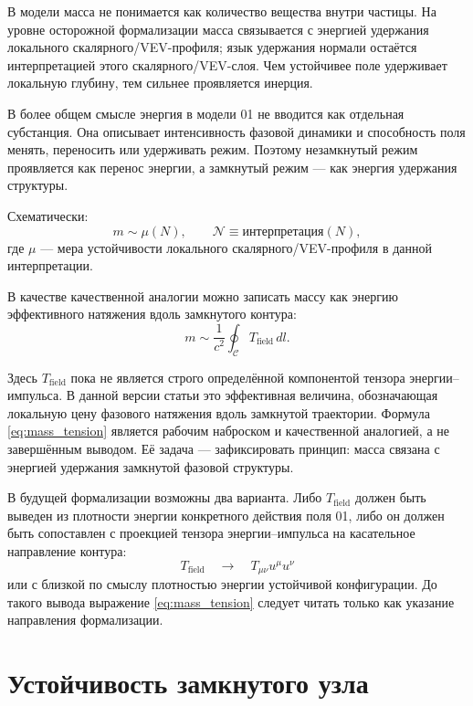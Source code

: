 \documentclass[11pt,a4paper]{article}
\newcommand{\normal}{\mathcal{N}}
\newcommand{\contour}{\mathcal{C}}
\begin{document}
В модели масса не понимается как количество вещества внутри частицы. На уровне осторожной формализации масса связывается с энергией удержания локального скалярного/VEV-профиля; язык удержания нормали остаётся интерпретацией этого скалярного/VEV-слоя. Чем устойчивее поле удерживает локальную глубину, тем сильнее проявляется инерция.

В более общем смысле энергия в модели 01 не вводится как отдельная субстанция. Она описывает интенсивность фазовой динамики и способность поля менять, переносить или удерживать режим. Поэтому незамкнутый режим проявляется как перенос энергии, а замкнутый режим --- как энергия удержания структуры.

Схематически:
\begin{equation}
 m \sim \mu(N), \qquad \normal \equiv \text{интерпретация}(N),
\end{equation}
где $\mu$ --- мера устойчивости локального скалярного/VEV-профиля в данной интерпретации.

В качестве качественной аналогии можно записать массу как энергию эффективного натяжения вдоль замкнутого контура:
\begin{equation}
 m \sim \frac{1}{c^2}\oint_{\contour} T_{\mathrm{field}}\, dl.
\label{eq:mass_tension}
\end{equation}

Здесь $T_{\mathrm{field}}$ пока не является строго определённой компонентой тензора энергии--импульса. В данной версии статьи это эффективная величина, обозначающая локальную цену фазового натяжения вдоль замкнутой траектории. Формула \eqref{eq:mass_tension} является рабочим наброском и качественной аналогией, а не завершённым выводом. Её задача --- зафиксировать принцип: масса связана с энергией удержания замкнутой фазовой структуры.

В будущей формализации возможны два варианта. Либо $T_{\mathrm{field}}$ должен быть выведен из плотности энергии конкретного действия поля 01, либо он должен быть сопоставлен с проекцией тензора энергии--импульса на касательное направление контура:
\begin{equation}
T_{\mathrm{field}} \quad \longrightarrow \quad T_{\mu\nu}u^{\mu}u^{\nu}
\end{equation}
или с близкой по смыслу плотностью энергии устойчивой конфигурации. До такого вывода выражение \eqref{eq:mass_tension} следует читать только как указание направления формализации.

\section{Устойчивость замкнутого узла}
\end{document}
